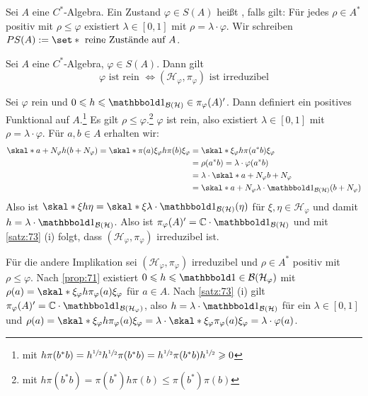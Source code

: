 \begin{definition}[{name=[reiner Zustand]}]
	Sei $A$ eine $C^*$-Algebra.
	Ein Zustand $\varphi \in S(A)$ heißt , falls gilt: Für jedes $\rho \in A^*$ positiv mit $\rho \le \varphi$ existiert $\lambda \in [0,1]$ mit $\rho= \lambda \cdot \varphi$.
	Wir schreiben $PS(A) := \set*{\text{ reine Zustände auf }A}$.
\end{definition}

\begin{satz}[{name=[Charakterisierung reiner Zustände]},label=satz:75]
	Sei $A$ eine $C^*$-Algebra, $\varphi \in S(A)$. Dann gilt
	\[
		\varphi \text{ ist rein } \iff (\mathcal{H}_\varphi, \pi_\varphi) \text{ ist irreduzibel}  
	\]
\end{satz}
\begin{beweis}
	Sei $\varphi$ rein und $0 \le h \le \ind_{\mathcal{B}(\mathcal{H})} \in \pi_\varphi(A)'$.
	Dann definiert 
	ein positives Funktional auf $A$.\footnote{mit $h \pi(b^*b) = h^{\sfrac{1}{2}}h^{\sfrac{1}{2}} \pi(b^*b) = h^{\sfrac{1}{2}} \pi(b^*b) h^{\sfrac{1}{2}} \geqslant 0$} 
	Es gilt $\rho \le \varphi$.\footnote{mit $h \pi(b^*b)= \pi(b^*)h \pi(b)\le \pi(b^*)\pi(b)$}
	$\varphi$ ist rein, also existiert $\lambda \in [0,1]$ mit $\rho =\lambda \cdot \varphi$.
	Für $a,b \in A$ erhalten wir:
	\begin{align}
		\skal*{a +N_\varphi}{h (b+ N_\varphi)} = \skal*{\pi(a) \xi_\varphi}{h \pi(b)\xi_\varphi} &= \skal*{\xi_\varphi}{h \pi(a^*b)\xi_\varphi} \\
		&= \rho(a^*b) =\lambda \cdot \varphi(a^*b) \\
		&= \lambda \cdot \skal*{a+ N_\varphi}{b + N_\varphi} \\
		&= \skal*{a + N_\varphi}{\lambda \cdot \ind_{\mathcal{B}(\mathcal{H})}(b+ N_\varphi)}
	\end{align}
	Also ist $\skal*{\xi}{h \eta}= \skal*{\xi}{\lambda \cdot \ind_{\mathcal{B}(\mathcal{H})}(\eta)}$ für $\xi,\eta \in \mathcal{H}_\varphi$ und damit $h= \lambda \cdot \ind_{\mathcal{B}(\mathcal{H})}$.
	Also ist $\pi_\varphi(A)'= \mathbb{C} \cdot \ind_{\mathcal{B}(\mathcal{H})}$ und mit \autoref{satz:73} (i) folgt, dass $(\mathcal{H}_\varphi,\pi_\varphi)$ irreduzibel ist.
	
	Für die andere Implikation sei $(\mathcal{H}_\varphi,\pi_\varphi)$ irreduzibel und $\rho \in A^*$ positiv mit $\rho \le \varphi$.
	Nach \autoref{prop:71} existiert $0 \le h \le \ind \in \mathcal{B}(\mathcal{H}_\varphi)$ mit $\rho(a) = \skal*{\xi_\varphi}{h \pi_\varphi(a)\xi_\varphi}$ für $a \in A$.
	Nach \autoref{satz:73} (i) gilt $\pi_\varphi(A)'=\mathbb{C} \cdot \ind_{\mathcal{B}(\mathcal{H_\varphi})}$, also $h= \lambda \cdot \ind_{\mathcal{B}(\mathcal{H})}$ für ein $\lambda \in [0,1]$ und $\rho(a)= \skal*{\xi_\varphi}{h \pi_\varphi(a)\xi_\varphi}= \lambda \cdot \skal*{\xi_\varphi}{\pi_\varphi(a)\xi_\varphi}= \lambda \cdot \varphi(a)$.
\end{beweis}

